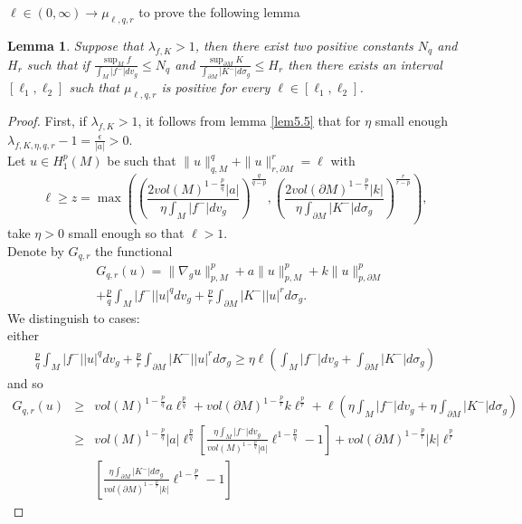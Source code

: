 \documentclass{Tran-l}
\newtheorem{lem}[thm]{Lemma}
\theoremstyle{definition}
\theoremstyle{remark}
\numberwithin{equation}{section}
\begin{document}
$\ell\in(0,\infty)\longrightarrow\mu_{\ell,q,r}$ to prove the
following lemma
\begin{lem}\label{lem5.6} Suppose that $\lambda_{f,K}>1$, then there exist
two positive constants $N_{q}$ and  $H_{r}$ such that if
$\frac{\sup_Mf}{\int_M|f^-|dv_g}\leq N_{q}$ and
$\frac{\sup_{\partial M}K}{\int_{\partial M}|K^-|d\sigma_g}\leq
H_{r}$ then there exists an  interval $\left[\ell_1,\ell_2\right]$
such that $\mu_{\ell,q,r}$ is positive for every $\ell\in
\left[\ell_1,\ell_2\right]$.
\end{lem}
\begin{proof}First, if $\lambda_{f,K}>1$, it follows from
lemma \ref{lem5.5} that for $\eta$
small enough $\lambda_{f,K,\eta,q,r}-1=\frac{\epsilon}{|a|}>0$.\\
Let $u\in H^p_1(M)$ be such that $\|u\|_{q,M}^q+\|u\|_{r,\partial
M}^r=\ell$  with \begin{equation}\label{eq5.1} \ell\geq z=\max
\left(\left(\frac{2vol(M)^{1-\frac{p}{q}}|a|}
{\eta\int_M|f^-|dv_g}\right)^{\frac{q}{q-p}},\left(
\frac{2vol(\partial M)^{1-\frac{p}{r}}|k|}{\eta\int_{\partial
M}|K^-|d\sigma_g}\right)^{\frac{r}{r-p}}\right),
\end{equation}
take $\eta>0$ small enough so that $\ell>1$.\\
Denote by $G_{q,r}$ the functional
\begin{eqnarray*}
   &G_{q,r}(u)=\|\nabla_gu\|^p_{p,M}+a\|u\|^p_{p,M}+k\|u\|^p_{p,\partial
    M}\\&+\frac{p}{q}\int_M|f^-||u|^qdv_g+
\frac{p}{r}\int_{\partial M}|K^-||u|^rd\sigma_g.
\end{eqnarray*}
We distinguish to cases:\\
either
\begin{eqnarray*}
\frac{p}{q}\int_M|f^-||u|^qdv_g+\frac{p}{r}\int_{\partial
M}|K^-||u|^rd\sigma_g\geq\eta\ell(\int_M|f^-|dv_g +\int_{\partial
M}|K^-|d\sigma_g)
\end{eqnarray*}
and so
\begin{eqnarray*}
G_{q,r}(u)&\geq&
vol(M)^{1-\frac{p}{q}}a\ell^{\frac{p}{q}}+vol(\partial
M)^{1-\frac{p}{r}}k\ell^{\frac{p}{r}}+\ell(\eta\int_M|f^-|dv_g
+\eta\int_{\partial
M}|K^-|d\sigma_g)\\&\geq&vol(M)^{1-\frac{p}{q}}|a|\ell^{\frac{p}{q}}
\left[\frac{\eta\int_M|f^-|dv_g}{vol(M)^{1-\frac{p}{q}}|a|}\ell^{1-\frac{p}{q}}-1\right]+
vol(\partial M)^{1-\frac{p}{r}}|k|\ell^{\frac{p}{r}}
\\&& \left[\frac{\eta\int_{\partial M}|K^-|d\sigma_g}{vol(\partial
M)^{1-\frac{p}{r}}|k|}\ell^{1-\frac{p}{r}}-1\right]

\end{eqnarray*}
\end{proof}
\end{document}
